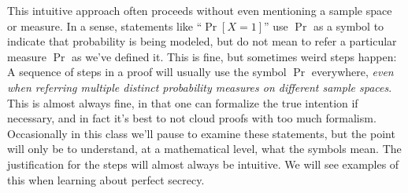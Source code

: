 \documentclass[11pt]{article}
\begin{document}
This intuitive approach often proceeds without even mentioning a sample space
or measure. In a sense, statements like ``$\Pr[X=1]$'' use $\Pr$ as a symbol to
indicate that probability is being modeled, but do not mean to refer a
particular measure $\Pr$ as we've defined it. This is fine, but sometimes weird
steps happen: A sequence of steps in a proof will usually use the symbol $\Pr$
everywhere, \emph{even when referring multiple distinct probability measures on
different sample spaces}.  This is almost always fine, in that one can
formalize the true intention if necessary, and in fact it's best to not cloud
proofs with too much formalism.  Occasionally in this class we'll pause to
examine these statements, but the point will only be to understand, at a
mathematical level, what the symbols mean. The justification for the steps will
almost always be intuitive. We will see examples of this when learning
about perfect secrecy.
\end{document}
